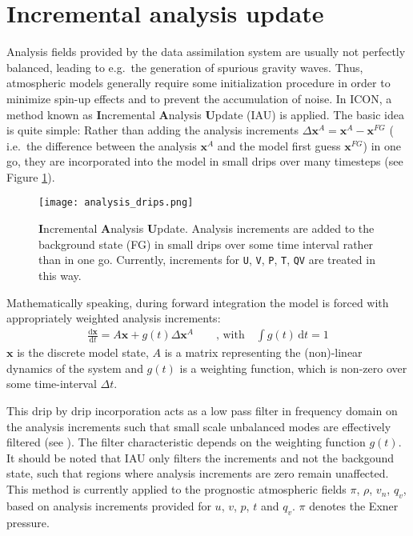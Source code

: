 

\section{Incremental analysis update}
Analysis fields provided by the data assimilation system are usually not perfectly balanced, leading to e.g.\ the generation of spurious gravity waves. 
Thus, atmospheric models generally require some initialization procedure in order to minimize spin-up effects and to prevent the accumulation of noise. In ICON, 
a method known as \textbf{I}ncremental \textbf{A}nalysis \textbf{U}pdate (IAU) \citep{Bloom96, Polavarapu04} is applied. The basic idea is quite simple: 
Rather than adding the analysis increments $\Delta \mathbf{x}^{A}=\mathbf{x}^{A} - \mathbf{x}^{FG}$ ( i.e.\ the difference between the analysis 
$\mathbf{x}^{A}$ and the model first guess $\mathbf{x}^{FG}$) in one go, they are incorporated into the model in small drips over many timesteps 
(see Figure \ref{fig_ana_drips}).
\begin{figure}[hbt]
 \centering
 \texttt{[image: analysis\_drips.png]}
 \caption{\textbf{I}ncremental \textbf{A}nalysis \textbf{U}pdate. Analysis increments are added to the background state (FG) in small drips over 
some time interval rather than in one go. Currently, increments for \texttt{U}, \texttt{V}, \texttt{P}, \texttt{T}, \texttt{QV} are treated in 
this way.}\label{fig_ana_drips}
\end{figure}

Mathematically speaking, during forward integration the model is forced with appropriately weighted analysis increments:
\begin{align}
 \frac{\mathrm{d} \mathbf{x}}{\mathrm{d} t} = A\mathbf{x} + g(t)\Delta\mathbf{x}^{A}\qquad \text{, with}\quad \int g(t)\, \mathrm{d}t = 1
\end{align}
$\mathbf{x}$ is the discrete model state, $A$ is a matrix representing the (non)-linear dynamics of the system and $g(t)$ is a weighting 
function, which is non-zero over some time-interval $\Delta t$.

This drip by drip incorporation acts as a low pass filter in frequency domain on the analysis increments such that 
small scale unbalanced modes are effectively filtered (see \cite{Bloom96}). The filter characteristic depends on the weighting function 
$g(t)$. It should be noted that IAU only filters the increments and not the backgound state, such that regions where analysis increments are 
zero remain unaffected. This method is currently applied to the prognostic atmospheric fields $\pi$, $\rho$, $v_{n}$, $q_{v}$, based on 
analysis increments provided for $u$, $v$, $p$, $t$ and $q_{v}$. $\pi$ denotes the Exner pressure.

